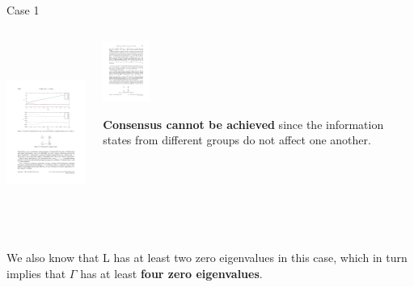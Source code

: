 \begin{frame}{Case 1}

\begin{columns}
 \begin{column}{.70\textwidth}
	\begin{center}
		\includegraphics[height=6cm]{images/StatesCase1.pdf}
	\end{center}
	\vskip 0.3cm
 \end{column}

 \begin{column}{.30\textwidth}
	\begin{center}
		\includegraphics[height=2cm]{images/GraphCase1.pdf}
	\end{center}
	{\textcolor{green!40!black}{\fontsize{13}{15}\textbf{Consensus cannot be achieved}}} 
	since the information states from different groups do not affect one another. 
 \end{column}
\end{columns}
We also know that  L has at least two zero eigenvalues in this case, which in turn implies that $\Gamma$ has at least 
{\textcolor{green!40!black}{\fontsize{13}{15}\textbf{four zero eigenvalues}}}.
\vskip 0.3cm

\end{frame}

